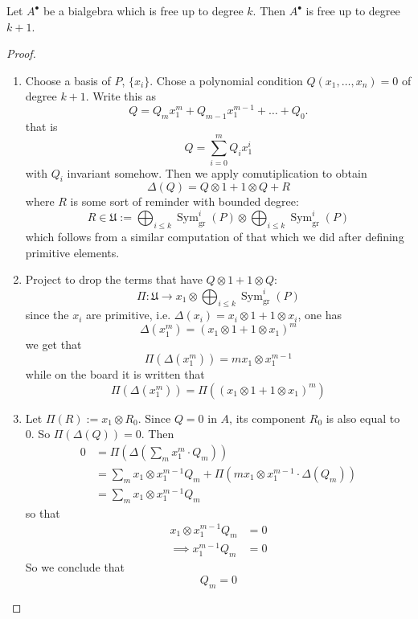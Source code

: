\begin{lemma}
	Let $A^\bullet$ be a bialgebra which is free up to degree $k$. Then $A^\bullet$ is free up to degree $k+1$.
\end{lemma}

\begin{proof}\leavevmode 
	\begin{enumerate}[label=\textbf{Step \arabic*}]
		\item Choose a basis of $P$, $\{x_i\}$. Chose a polynomial condition $Q(x_1,\ldots,x_n)=0$ of degree $k+1$. Write this as
			\[Q=Q_mx_1^m+Q_{m-1}x_1^{m-1}+\ldots+Q_0.\]
			that is
			\[Q=\sum_{i=0}^mQ_ix_1^i\]
			with $Q_i$ invariant somehow. Then we apply comutiplication to obtain
			\[\Delta(Q)=Q\otimes 1+1\otimes Q+R\]
			where $R$ is some sort of reminder with bounded degree:
			\[R\in\mathfrak{U}:=\bigoplus_{i\leq k} \operatorname{Sym}^i_{\operatorname{gr}}(P)\otimes \bigoplus_{i\leq k} \operatorname{Sym}_{\operatorname{gr}}^i(P)  \]
			which follows from a similar computation of that which we did after defining primitive elements.

			\item Project to drop the terms that have $Q\otimes 1+1\otimes Q$:
				\[\Pi:\mathfrak{U}\to x_1\otimes \bigoplus_{i\leq k}   \operatorname{Sym}^i_{\operatorname{gr}}(P)\]
				since the $x_i$ are primitive, i.e. $\Delta(x_i)=x_i\otimes 1+1\otimes x_i$, one has
				\[\Delta(x_1^m)=(x_1\otimes 1+1 \otimes x_1)^m\]
				we get that
				\[\Pi(\Delta(x_1^m))=mx_1\otimes x_1^{m-1}\]
				while on the board it is written that
				\[\Pi(\Delta(x_1^m))=\Pi((x_1\otimes 1+1\otimes x_1)^m)\]

			\item Let $\Pi(R):=x_1\otimes R_0$. Since $Q=0$ in $A$, its component $R_0$ is also equal to 0. So $\Pi(\Delta(Q))=0$. Then
				\begin{align*}
					0&=\Pi \left( \Delta \left( \sum_{m}x_1^m\cdot Q_m \right)  \right)\\
					 & =\sum_{m}x_1\otimes x_1^{m-1}Q_m+\Pi(mx_1\otimes x_1^{m-1}\cdot  \Delta(Q_m))\\
					& =\sum_{m}x_1\otimes x_1^{m-1}Q_m
				\end{align*}
				so that 
				\begin{align*}
					x_1\otimes x_1^{m-1}Q_m&=0\\
					\implies x_1^{m-1}Q_m&=0
				\end{align*}
				So we conclude that
				\[Q_m=0\]
		\end{enumerate}
	\end{proof}

